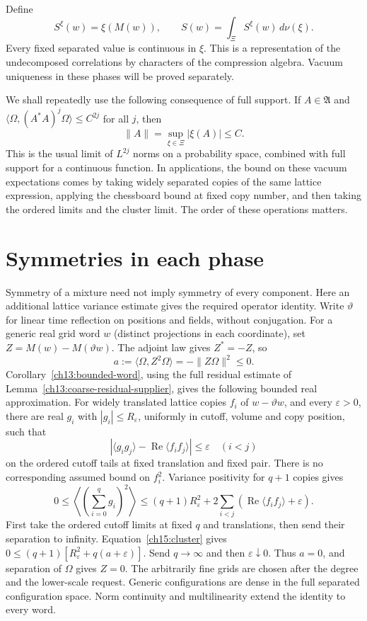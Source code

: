 Define
\begin{equation}
 S^\xi(w)=\xi(M(w)),\qquad
 S(w)=\int_\Xi S^\xi(w)\,d\nu(\xi).
 \label{ch15:mixture}
\end{equation}
Every fixed separated value is continuous in $\xi$. This is a
representation of the undecomposed correlations by characters of the compression
algebra. Vacuum uniqueness in these phases will be proved separately.

We shall repeatedly use the following consequence of full support.
If $A\in\mathfrak A$ and
$\langle\Omega,(A^*A)^j\Omega\rangle\le C^{2j}$ for all $j$, then
\begin{equation}
                        \|A\|=\sup_{\xi\in\Xi}|\xi(A)|\le C.
 \label{ch15:moment-norm}
\end{equation}
This is the usual limit of $L^{2j}$ norms on a probability space,
combined with full support for a continuous function. In applications,
the bound on these vacuum expectations comes by taking widely separated copies of the same
lattice expression, applying the chessboard bound at fixed copy number,
and then taking the ordered limits and the cluster limit.
The order of these operations matters.

\section{Symmetries in each phase}
\label{ch15:phase-symmetry}

Symmetry of a mixture need not imply symmetry of every component.
Here an additional lattice variance estimate gives the required
operator identity. Write $\vartheta$ for linear time reflection on
positions and fields, without conjugation. For a generic real grid word $w$ (distinct projections in each
coordinate),
set $Z=M(w)-M(\vartheta w)$. The adjoint law gives $Z^*=-Z$, so
\[
 a:=\langle\Omega,Z^2\Omega\rangle=-\|Z\Omega\|^2\le0.
\]
Corollary~\ref{ch13:bounded-word}, using the full residual
estimate of Lemma~\ref{ch13:coarse-residual-supplier}, gives the
following bounded real approximation. For widely translated lattice copies $f_i$ of
$w-\vartheta w$, and every $\varepsilon>0$, there are real $g_i$
with $|g_i|\le R_\varepsilon$, uniformly in cutoff, volume and copy
position, such that
\[
 |\langle g_ig_j\rangle-\operatorname{Re}\langle f_if_j\rangle|
                                      \le\varepsilon\quad(i<j)
\]
on the ordered cutoff tails at fixed translation and fixed pair.
There is no corresponding assumed bound on $f_i^2$.
Variance positivity for $q+1$ copies gives
\[
 0\le\left\langle\left(\sum_{i=0}^qg_i\right)^2\right\rangle
 \le(q+1)R_\varepsilon^2+
              2\sum_{i<j}(\operatorname{Re}\langle f_if_j\rangle+\varepsilon).
\]
First take the ordered cutoff limits at fixed $q$ and translations,
then send their separation to infinity. Equation~\eqref{ch15:cluster}
gives $0\le(q+1)[R_\varepsilon^2+q(a+\varepsilon)]$.
Send $q\to\infty$ and then $\varepsilon\downarrow0$.
Thus $a=0$, and separation of $\Omega$ gives $Z=0$.
The arbitrarily fine grids are chosen after the degree and the lower-scale request.
Generic configurations are dense in the full separated configuration
space. Norm continuity and multilinearity
extend the identity to every word.

